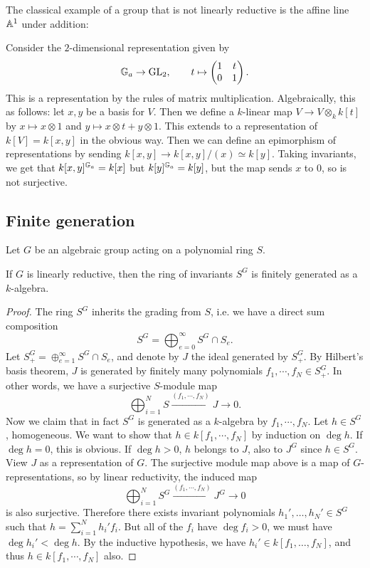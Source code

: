 \documentclass[11pt, english]{article}
\begin{document}
The classical example of a group that is not linearly reductive is the affine line $\mathbb{A}^1$ under addition:
\begin{example}
 Consider the $2$-dimensional representation given by
\[
\mathbb{G}_a \to \operatorname{GL}_2, \qquad t \mapsto \begin{pmatrix} 1 & t \\ 0 & 1 \end{pmatrix}.
\]
This is a representation by the rules of matrix multiplication. Algebraically, this as follows: let $x,y$ be a basis for $V$. Then we define a $k$-linear map $V \to V \otimes_k k[t]$ by $x \mapsto x \otimes 1$ and $y \mapsto x \otimes t + y \otimes 1$. This extends to a representation of $k[V]=k[x,y]$ in the obvious way. Then we can define an epimorphism of representations by sending $k[x,y] \to k[x,y]/(x) \simeq k[y]$. Taking invariants, we get that $k[x,y]^{\mathbb{G}_a} = k[x]$ but $k[y]^{\mathbb{G}_a}=k[y]$, but the map sends $x$ to $0$, so is not surjective.
\end{example}

\subsection{Finite generation}

Let $G$ be an algebraic group acting on a polynomial ring $S$.

\begin{thm}[Hilbert]
If $G$ is linearly reductive, then the ring of invariants $S^G$ is finitely generated as a $k$-algebra.
\end{thm}
\begin{proof}
The ring $S^G$ inherits the grading from $S$, i.e. we have a direct sum composition
$$
S^G = \bigoplus_{e=0}^\infty S^G \cap S_e.
$$
Let $S_+^G = \oplus_{e=1}^\infty S^G \cap S_e$, and denote by $J$ the ideal generated by $S_+^G$. By Hilbert's basis theorem, $J$ is generated by finitely many polynomials $f_1,\cdots,f_N \in S_+^G$. In other words, we have a surjective $S$-module map
$$
\bigoplus_{i=1}^N S \xrightarrow{(f_1,\cdots,f_N)} J \to 0.
$$
Now we claim that in fact $S^G$ is generated as a $k$-algebra by $f_1,\cdots,f_N$. Let $h \in S^G$, homogeneous. We want to show that $h \in k[f_1,\cdots,f_N]$ by induction on $\deg h$. If $\deg h = 0$, this is obvious. If $\deg h> 0$, $h$ belongs to $J$, also to $J^G$ since $h \in S^G$. View $J$ as a representation of $G$. The surjective module map above is a map of $G$-representations, so by linear reductivity, the induced map
$$
\bigoplus_{i=1}^N S^G \xrightarrow{(f_1,\cdots,f_N)} J^G \to 0
$$
is also surjective. Therefore there exists invariant polynomials $h_1',\ldots,h_N' \in S^G$ such that $h= \sum_{i=1}^N h_i' f_i$. But all of the $f_i$ have $\deg f_i > 0$, we must have $\deg h_i' < \deg h$. By the inductive hypothesis, we have $h_i' \in k[f_1,\ldots,f_N]$, and thus $h \in k[f_1,\cdots,f_N]$ also.
\end{proof}
 
\end{document}
